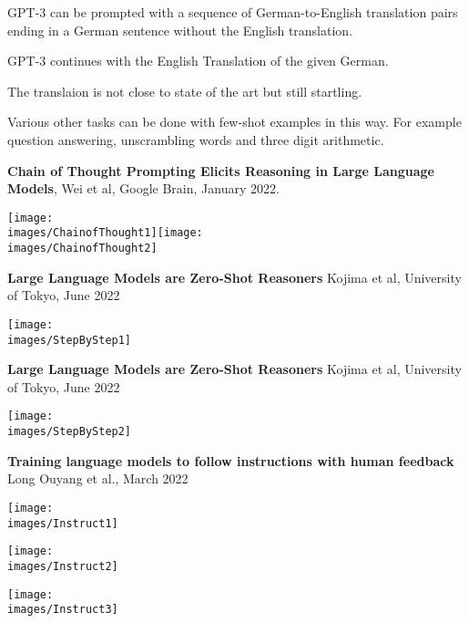 {

GPT-3 can be prompted with a sequence of German-to-English translation pairs ending in a German sentence without the English translation.

\vfill
GPT-3 continues with the English Translation of the given German.

\vfill
The translaion is not close to state of the art but still startling.

\vfill
Various other tasks can be done with few-shot examples in this way.  For example question answering, unscrambling words and three digit arithmetic.


{\bf Chain of Thought Prompting Elicits Reasoning in Large Language Models}, Wei et al, Google Brain, January 2022.

\vfill
\centerline{\texttt{[image: \\images/ChainofThought1]}\texttt{[image: \\images/ChainofThought2]}}


{\bf Large Language Models are Zero-Shot Reasoners} Kojima et al, University of Tokyo, June 2022

\vfill

\centerline{\texttt{[image: \\images/StepByStep1]}}


{\bf Large Language Models are Zero-Shot Reasoners} Kojima et al, University of Tokyo, June 2022

\vfill
\centerline{\texttt{[image: \\images/StepByStep2]}}


{\Large {\bf Training language models to follow instructions with human feedback}
Long Ouyang et al., March 2022}

\centerline{\texttt{[image: \\images/Instruct1]}}



\centerline{\texttt{[image: \\images/Instruct2]}}


\centerline{\texttt{[image: \\images/Instruct3]}}


}

